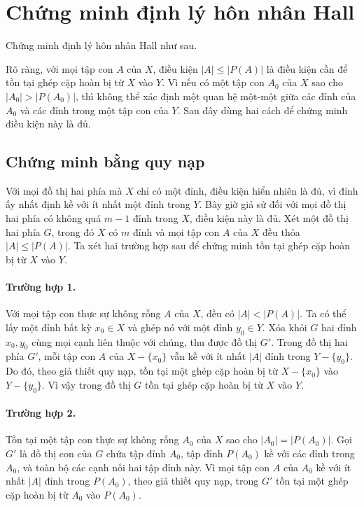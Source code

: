 \documentclass[11pt]{article}
\begin{document}
\appendix
\section{Chứng minh định lý hôn nhân Hall}

Chứng minh định lý hôn nhân Hall như sau.

Rõ ràng, với mọi tập con \(A\) của \(X\), điều kiện \(|A|\le |P(A)|\) là
điều kiện cần để tồn tại ghép cặp hoàn bị từ \(X\) vào \(Y\). Vì nếu có một
tập con \(A_0\) của \(X\) sao cho \(|A_0|>|P(A_0)|\), thì không thể xác định
một quan hệ một-một giữa các đỉnh của \(A_0\) và các đỉnh trong một tập con
của \(Y\). Sau đây dùng hai cách để chứng minh điều kiện này là đủ.

\subsection{Chứng minh bằng quy nạp}

Với mọi đồ thị hai phía mà \(X\) chỉ có một đỉnh, điều kiện hiển nhiên là
đủ, vì đỉnh ấy nhất định kề với ít nhất một đỉnh trong \(Y\). Bây giờ giả sử
đối với mọi đồ thị hai phía có không quá \(m-1\) đỉnh trong \(X\), điều kiện
này là đủ. Xét một đồ thị hai phía \(G\), trong đó \(X\) có \(m\) đỉnh và
mọi tập con \(A\) của \(X\) đều thỏa \(|A|\le |P(A)|\). Ta xét hai trường
hợp sau để chứng minh tồn tại ghép cặp hoàn bị từ \(X\) vào \(Y\).

\paragraph{Trường hợp 1.}
Với mọi tập con thực sự không rỗng \(A\) của \(X\), đều có
\(|A|<|P(A)|\). Ta có thể lấy một đỉnh bất kỳ \(x_0\in X\) và ghép nó với
một đỉnh \(y_0\in Y\). Xóa khỏi \(G\) hai đỉnh \(x_0,y_0\) cùng mọi cạnh
liên thuộc với chúng, thu được đồ thị \(G'\). Trong đồ thị hai phía \(G'\),
mỗi tập con \(A\) của \(X-\{x_0\}\) vẫn kề với ít nhất \(|A|\) đỉnh trong
\(Y-\{y_0\}\). Do đó, theo giả thiết quy nạp, tồn tại một ghép cặp hoàn bị
từ \(X-\{x_0\}\) vào \(Y-\{y_0\}\). Vì vậy trong đồ thị \(G\) tồn tại ghép
cặp hoàn bị từ \(X\) vào \(Y\).

\paragraph{Trường hợp 2.}
Tồn tại một tập con thực sự không rỗng \(A_0\) của \(X\) sao cho
\(|A_0|=|P(A_0)|\). Gọi \(G'\) là đồ thị con của \(G\) chứa tập đỉnh
\(A_0\), tập đỉnh \(P(A_0)\) kề với các đỉnh trong \(A_0\), và toàn bộ các
cạnh nối hai tập đỉnh này. Vì mọi tập con \(A\) của \(A_0\) kề với ít nhất
\(|A|\) đỉnh trong \(P(A_0)\), theo giả thiết quy nạp, trong \(G'\) tồn tại
một ghép cặp hoàn bị từ \(A_0\) vào \(P(A_0)\).
\end{document}
